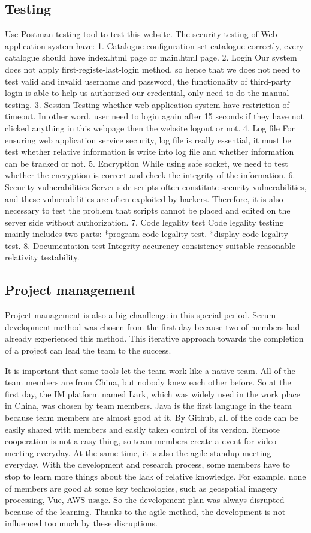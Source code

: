 \documentclass[conference]{IEEEtran}
\begin{document}
\subsection{Testing}
Use Postman testing tool to test this website. The security testing of Web application system have:
1. Catalogue configuration
set catalogue correctly, every catalogue should have index.html page or main.html page.
2. Login
Our system does not apply first-registe-last-login method, so hence that we does not need to test
valid and invalid username and password, the functionality of third-party login is able to help
us authorized our credential, only need to do the manual testing.
3. Session
Testing whether web application system have restriction of timeout. In other word, user need to
login again after 15 seconds if they have not clicked anything in this webpage then the website
logout or not.
4. Log file
For ensuring web application service security, log file is really essential, it must be test whether
relative information is write into log file and whether information can be tracked or not.
5. Encryption
While using safe socket, we need to test whether the encryption is correct and check the integrity
of the information.
6. Security vulnerabilities
Server-side scripts often constitute security vulnerabilities, and these vulnerabilities are often exploited by hackers.
Therefore, it is also necessary to test the problem that scripts cannot be placed and edited on the server side without authorization.
7. Code legality test
Code legality testing mainly includes two parts:
*program code legality test.
*display code legality test.
8. Documentation test
Integrity accurency consistency suitable reasonable relativity testability.
\subsection{Project management}

Project management is also a big chanllenge in this special period. Scrum development method was chosen from the first day because two of members
had already experienced this method. This iterative approach towards the completion of a project can lead the team to the success.

It is important that some tools let the team work like a native team. All of the team members are from China, but nobody knew each other before. 
So at the first day, the IM platform named Lark, which was widely used in the work place in China, was chosen by team members. Java is the first 
language in the team because team members are almost good at it. By Github, all of the code can be easily shared with members and easily taken 
control of its version. Remote cooperation is not a easy thing, so team members create a event for video meeting everyday. At the same time, it 
is also the agile standup meeting everyday. With the development and research process, some members have to stop to learn more things about the 
lack of relative knowledge. For example, none of members are good at some key technologies, such as geospatial imagery processing, Vue, AWS usage. 
So the development plan was always disrupted because of the learning. Thanks to the agile method, the development is not influenced too much by 
these disruptions. 
\end{document}
